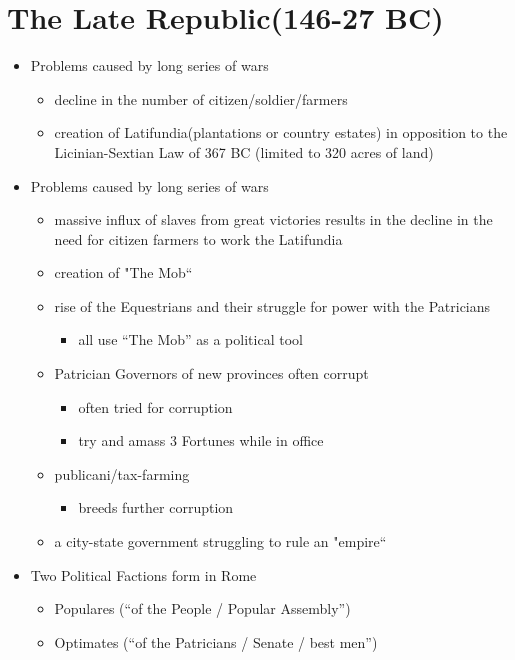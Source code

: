 \documentclass[12pt, twoside]{article}
\begin{document}
\section{The Late Republic(146-27 BC)}
\begin{itemize}
\item Problems caused by long series of wars
	\begin{itemize}
	\item decline in the number of citizen/soldier/farmers
	\item creation of Latifundia(plantations or country estates) in opposition to the Licinian-Sextian Law of 367 BC (limited to 320 acres of land)
	\end{itemize}
\item Problems caused by long series of wars
	\begin{itemize}
	\item massive influx of slaves from great victories results in the decline in the need for citizen farmers to work the Latifundia
	\item creation of "The Mob“
	\item rise of the Equestrians and their struggle for power with the Patricians
		\begin{itemize}
		\item all use “The Mob” as a political tool
		\end{itemize}
	\item Patrician Governors of new provinces often corrupt
		\begin{itemize}
		\item often tried for corruption
		\item try and amass 3 Fortunes while in office
		\end{itemize}
	\item publicani/tax-farming
		\begin{itemize}
		\item breeds further corruption
		\end{itemize}
	\item a city-state government struggling to rule an "empire“
	\end{itemize}
\item Two Political Factions form in Rome
	\begin{itemize}
	\item Populares (“of the People / Popular Assembly”)
	\item Optimates (“of the Patricians / Senate / best men”)
	\end{itemize}
\end{itemize}
\end{document}
